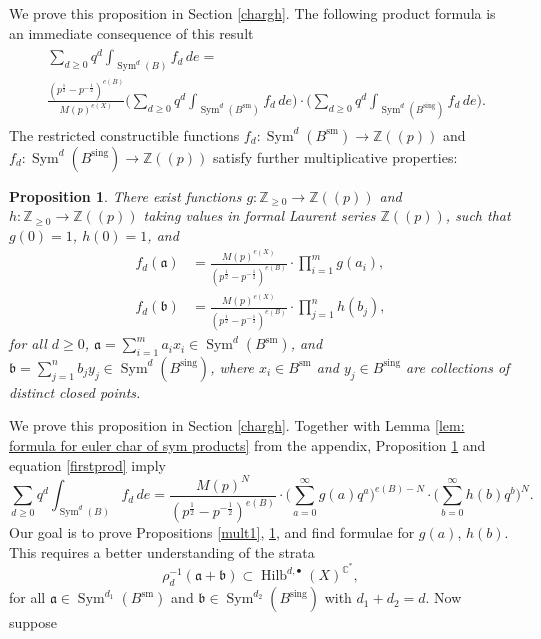 \documentclass{amsart}
\newtheorem{proposition}[theorem]{Proposition}
\theoremstyle{definition}
\newcommand{\CC} {\mathbb{C}}          %
\newcommand{\ZZ} {\mathbb{Z}}		%
\newcommand{\Sym}{\operatorname{Sym}}
\newcommand{\Hilb}{\operatorname{Hilb}}
\newcommand{\sm}{\operatorname{sm}}
\newcommand{\sing}{\operatorname{sing}}
\begin{document}
We prove this proposition in Section \ref{chargh}. The following product formula is an immediate consequence of this result
\begin{align}
\begin{split} \label{firstprod}
&\sum_{d \geq 0} q^d \int_{\Sym^d(B)} f_d \, de = \\
&\frac{(p^{\frac{1}{2}} - p^{-\frac{1}{2}})^{e(B)}}{M(p)^{e(X)}}  \Bigg( \sum_{d \geq 0} q^d \int_{\Sym^d(B^{\sm})} f_d \, de \Bigg) \cdot \Bigg( \sum_{d \geq 0} q^d \int_{\Sym^d(B^{\sing})} f_d \, de \Bigg). 
\end{split}
\end{align}
The restricted constructible functions $f_d  : \Sym^d(B^{\sm}) \rightarrow \ZZ(\!(p)\!)$ and $f_d  : \Sym^d(B^{\sing}) \rightarrow \ZZ(\!(p)\!)$ satisfy further multiplicative properties:
\begin{proposition} \label{mult2}
There exist functions $g : \ZZ_{\geq 0} \rightarrow \ZZ(\!(p)\!)$ and $h : \ZZ_{\geq 0} \rightarrow \ZZ(\!(p)\!)$ taking values in formal Laurent series $\ZZ(\!(p)\!)$, such that $g(0)=1$, $h(0)=1$, and
\begin{align*}
f_{d}(\mathfrak{a}) &= \frac{M(p)^{e(X)}}{(p^{\frac{1}{2}} - p^{-\frac{1}{2}})^{e(B)}} \cdot \prod_{i=1}^m g(a_i), \\
f_{d}(\mathfrak{b}) &= \frac{M(p)^{e(X)}}{(p^{\frac{1}{2}} - p^{-\frac{1}{2}})^{e(B)}} \cdot \prod_{j=1}^n h(b_j), 
\end{align*}
for all $d \geq 0$, $\mathfrak{a} = \sum_{i=1}^m a_i x_i \in \Sym^{d}(B^{\sm})$, and $\mathfrak{b} = \sum_{j=1}^n b_j y_j \in \Sym^{d}(B^{\sing})$, where $x_i \in B^{\sm}$ and $y_j \in B^{\sing}$ are collections of distinct closed points.
\end{proposition}
We prove this proposition in Section \ref{chargh}. Together with Lemma \ref{lem: formula for euler char of sym products} from the appendix, Proposition \ref{mult2} and equation \eqref{firstprod} imply
\begin{equation} \label{initialprod}
\sum_{d \geq 0} q^d \int_{\Sym^d(B)} f_d \, de = \frac{M(p)^{N}}{(p^{\frac{1}{2}} - p^{-\frac{1}{2}})^{e(B)}} \cdot \Bigg( \sum_{a=0}^{\infty} g(a) q^a \Bigg)^{e(B) - N} \cdot \Bigg( \sum_{b=0}^{\infty} h(b) q^b \Bigg)^N.
\end{equation}
Our goal is to prove Propositions \ref{mult1}, \ref{mult2}, and find formulae for $g(a)$, $h(b)$. This requires a better understanding of the strata
$$
\rho_{d}^{-1} (\mathfrak{a} + \mathfrak{b}) \subset \Hilb^{d, \bullet}(X)^{\CC^*},
$$
for all $\mathfrak{a} \in \Sym^{d_1}(B^{\sm})$ and $\mathfrak{b} \in \Sym^{d_2}(B^{\sing})$ with $d_1+d_2=d$. Now suppose 
\end{document}

